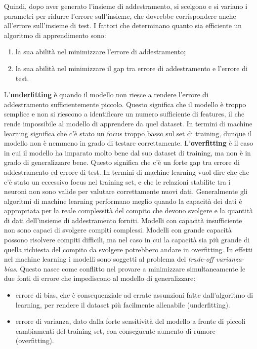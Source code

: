 Quindi, dopo aver generato l’insieme di addestramento, si scelgono e si variano i parametri per
 ridurre l’errore sull’insieme, che dovrebbe corrispondere anche all’errore sull’insieme di test.
I fattori che determinano quanto sia efficiente un algoritmo di apprendimento sono:
\begin{enumerate}
  \item la sua abilità nel minimizzare l’errore di addestramento;
  \item la sua abilità nel minimizzare il gap tra errore di addestramento e l’errore di test.\\
\end{enumerate}
L’\textbf{underfitting} è quando il modello non riesce a rendere l’errore di addestramento
 sufficientemente piccolo. Questo significa che il modello è troppo semplice e non si 
 riescono a identificare un numero sufficiente di features, il che rende impossibile al 
 modello di apprendere da quel dataset. In termini di machine learning significa che c’è 
 stato un focus troppo basso sul set di training, dunque il modello non è nemmeno in grado
  di testare correttamente.
L’\textbf{overfitting} è il caso in cui il modello ha imparato molto bene dal suo dataset di training,
 ma non è in grado di generalizzare bene. Questo significa che c’è un forte gap tra errore 
 di addestramento ed errore di test. In termini di machine learning vuol dire che che c’è
  stato un eccessivo focus nel training set, e che le relazioni stabilite tra i neuroni
   non sono valide per valutare correttamente nuovi dati.  
Generalmente gli algoritmi di machine learning performano meglio quando la capacità dei dati 
è appropriata per la reale complessità del compito che devono svolgere e la quantità di dati 
dell’insieme di addestramento forniti. Modelli con capacità insufficiente non sono capaci di
 svolgere compiti complessi. Modelli con grande capacità possono risolvere compiti difficili,
  ma nel caso in cui la capacità sia più grande di quella richiesta del compito da svolgere
   potrebbero andare in overfitting.
In effetti nel machine learning i modelli sono soggetti al problema del \emph{trade-off varianza-bias}.
 Questo nasce come conflitto nel provare a minimizzare simultaneamente le due fonti di errore che 
 impediscono al modello di generalizzare:
 \begin{itemize}
     \item errore di bias, che è consequenziale ad errate assunzioni fatte dall’algoritmo di learning, 
per rendere il dataset più facilmente allenabile (underfitting).
\item errore di varianza, dato dalla forte sensitività del modello a fronte di piccoli cambiamenti 
del training set, con conseguente aumento di rumore (overfitting). 
\end{itemize}

